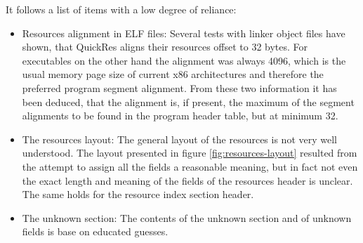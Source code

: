 \documentclass[12pt, a4paper]{article}
\begin{document}
\noindent
It follows a list of items with a low degree of reliance:
\begin{itemize}
\item{Resources alignment in ELF files: Several tests with linker object files
  have shown, that QuickRes aligns their resources offset to 32 bytes.
  For executables on the other hand the alignment was always 4096, which is
  the usual memory page size of current x86 architectures and therefore the
  preferred program segment alignment. From these two information it has been
  deduced, that the alignment is, if present, the maximum of
  the segment alignments to be found in the program header table,
  but at minimum 32.}
\item{The resources layout: The general layout of the resources is not very
  well understood. The layout presented in figure \ref{fig:resources-layout}
  resulted from the attempt to assign all the fields a reasonable meaning, but
  in fact not even the exact length and meaning of the fields of the resources
  header is unclear. The same holds for the resource index section header.}
\item{The unknown section: The contents of the unknown section and of unknown
  fields is base on educated guesses.}
\end{itemize}
\end{document}
